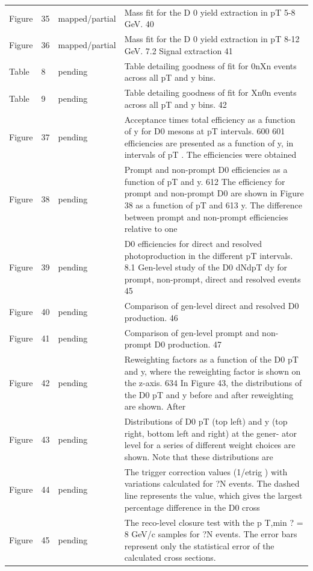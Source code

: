\documentclass[11pt]{article}
\begin{document}
\begin{longtable}{lll p{}}
Figure & 35 & mapped/partial & Mass fit for the D 0 yield extraction in pT 5-8 GeV. 40 \\
Figure & 36 & mapped/partial & Mass fit for the D 0 yield extraction in pT 8-12 GeV. 7.2 Signal extraction 41 \\
Table & 8 & pending & Table detailing goodness of fit for 0nXn events across all pT and y bins. \\
Table & 9 & pending & Table detailing goodness of fit for Xn0n events across all pT and y bins. 42 \\
Figure & 37 & pending & Acceptance times total efficiency as a function of y for D0 mesons at pT intervals. 600 601 efficiencies are presented as a function of y, in intervals of pT . The efficiencies were obtained \\
Figure & 38 & pending & Prompt and non-prompt D0 efficiencies as a function of pT and y. 612 The efficiency for prompt and non-prompt D0 are shown in Figure 38 as a function of pT and 613 y. The difference between prompt and non-prompt efficiencies relative to one \\
Figure & 39 & pending & D0 efficiencies for direct and resolved photoproduction in the different pT intervals. 8.1 Gen-level study of the D0 dNdpT dy for prompt, non-prompt, direct and resolved events 45 \\
Figure & 40 & pending & Comparison of gen-level direct and resolved D0 production. 46 \\
Figure & 41 & pending & Comparison of gen-level prompt and non-prompt D0 production. 47 \\
Figure & 42 & pending & Reweighting factors as a function of the D0 pT and y, where the reweighting factor is shown on the z-axis. 634 In Figure 43, the distributions of the D0 pT and y before and after reweighting are shown. After \\
Figure & 43 & pending & Distributions of D0 pT (top left) and y (top right, bottom left and right) at the gener- ator level for a series of different weight choices are shown. Note that these distributions are \\
Figure & 44 & pending & The trigger correction values (1/etrig ) with variations calculated for ?N events. The dashed line represents the value, which gives the largest percentage difference in the D0 cross \\
Figure & 45 & pending & The reco-level closure test with the p T,min ? = 8 GeV/c samples for ?N events. The error bars represent only the statistical error of the calculated cross sections. \\

\end{longtable}
\end{document}
